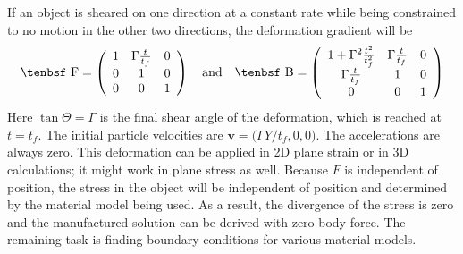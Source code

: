 \documentclass[11pt]{book}
\renewcommand{\vec}[1]{\boldsymbol{#1}}
\def\B{\hbox{\tenbsf B}}
\def\F{\hbox{\tenbsf F}}
\begin{document}
If an object is sheared on one direction at a constant rate while being constrained to no motion in the other two directions, the deformation gradient will be
\begin{equation}
    \F = \left(\begin{array}{ccc} 1 & \Gamma{t\over t_f} & 0 \\
               0 & 1 & 0 \\
               0 & 0 & 1 \end{array} \right) \quad {\rm and} \quad
    \B = \left(\begin{array}{ccc} 1 + \Gamma^2{t^2\over t_f^2} & \Gamma{t\over t_f} & 0 \\
               \Gamma{t\over t_f} & 1 & 0 \\
               0 & 0 & 1 \end{array} \right)
\end{equation}
Here $\tan\Theta = \Gamma$ is the final shear angle of the deformation, which is reached at $t=t_f$. The initial particle velocities are $\vec v = \bigl(\Gamma Y/t_f,0,0\bigr)$. The accelerations are always zero. This deformation can be applied in 2D plane strain or in 3D calculations; it might work in plane stress as well. Because $F$ is independent of position, the stress in the object will be independent of position and determined by the material model being used. As a result, the divergence of the stress is zero and the manufactured solution can be derived with zero body force. The remaining task is finding boundary conditions for various material models.
\end{document}
